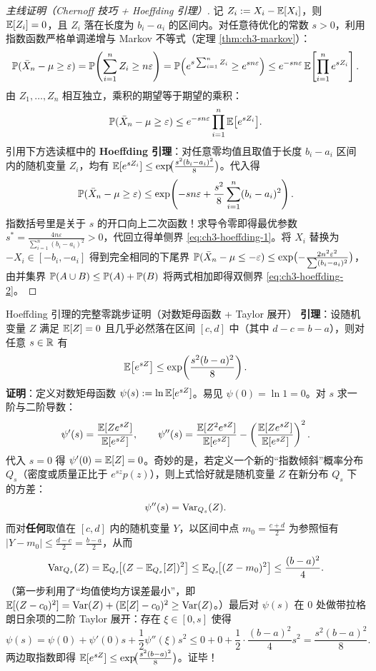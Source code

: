 \begin{proof}[主线证明（Chernoff 技巧 + Hoeffding 引理）]
记 $Z_i := X_i - \mathbb{E}[X_i]$，则 $\mathbb{E}[Z_i] = 0$，且 $Z_i$ 落在长度为 $b_i - a_i$ 的区间内。对任意待优化的常数 $s > 0$，利用指数函数严格单调递增与 Markov 不等式（定理 \ref{thm:ch3-markov}）：
\[
  \mathbb{P}(\bar{X}_n - \mu \ge \varepsilon)
  = \mathbb{P}\!\left(\sum_{i=1}^n Z_i \ge n\varepsilon\right)
  = \mathbb{P}\!\left(e^{s \sum_{i=1}^n Z_i} \ge e^{s n \varepsilon}\right)
  \le e^{-s n \varepsilon}\, \mathbb{E}\!\left[\prod_{i=1}^n e^{s Z_i}\right].
\]
由 $Z_1, \dots, Z_n$ 相互独立，乘积的期望等于期望的乘积：
\[
  \mathbb{P}(\bar{X}_n - \mu \ge \varepsilon)
  \le e^{-s n \varepsilon} \prod_{i=1}^n \mathbb{E}\bigl[e^{s Z_i}\bigr].
\]
引用下方选读框中的 \textbf{Hoeffding 引理}：对任意零均值且取值于长度 $b_i - a_i$ 区间内的随机变量 $Z_i$，均有 $\mathbb{E}[e^{s Z_i}] \le \exp\!\bigl(\frac{s^2 (b_i - a_i)^2}{8}\bigr)$。代入得
\[
  \mathbb{P}(\bar{X}_n - \mu \ge \varepsilon)
  \le \exp\!\left(-s n \varepsilon + \frac{s^2}{8}\sum_{i=1}^n (b_i - a_i)^2\right).
\]
指数括号里是关于 $s$ 的开口向上二次函数！求导令零即得最优参数 $s^* = \frac{4 n \varepsilon}{\sum_{i=1}^n (b_i - a_i)^2} > 0$，代回立得单侧界 \eqref{eq:ch3-hoeffding-1}。将 $X_i$ 替换为 $-X_i \in [-b_i, -a_i]$ 得到完全相同的下尾界 $\mathbb{P}(\bar{X}_n - \mu \le -\varepsilon) \le \exp\bigl(-\frac{2n^2\varepsilon^2}{\sum (b_i-a_i)^2}\bigr)$，由并集界 $\mathbb{P}(A \cup B) \le \mathbb{P}(A) + \mathbb{P}(B)$ 将两式相加即得双侧界 \eqref{eq:ch3-hoeffding-2}。
\end{proof}

\begin{extBox}{Hoeffding 引理的完整零跳步证明（对数矩母函数 + Taylor 展开）}
\textbf{引理}：设随机变量 $Z$ 满足 $\mathbb{E}[Z] = 0$ 且几乎必然落在区间 $[c, d]$ 中（其中 $d - c = b - a$），则对任意 $s \in \mathbb{R}$ 有
\[
  \mathbb{E}\bigl[e^{s Z}\bigr] \le \exp\!\left(\frac{s^2 (b-a)^2}{8}\right).
\]
\textbf{证明}：定义对数矩母函数 $\psi(s) := \ln \mathbb{E}[e^{s Z}]$。易见 $\psi(0) = \ln 1 = 0$。对 $s$ 求一阶与二阶导数：
\[
  \psi'(s) = \frac{\mathbb{E}[Z e^{sZ}]}{\mathbb{E}[e^{sZ}]},
  \qquad
  \psi''(s) = \frac{\mathbb{E}[Z^2 e^{sZ}]}{\mathbb{E}[e^{sZ}]} - \left(\frac{\mathbb{E}[Z e^{sZ}]}{\mathbb{E}[e^{sZ}]}\right)^2.
\]
代入 $s = 0$ 得 $\psi'(0) = \mathbb{E}[Z] = 0$。奇妙的是，若定义一个新的“指数倾斜”概率分布 $Q_s$（密度或质量正比于 $e^{sz} p(z)$），则上式恰好就是随机变量 $Z$ 在新分布 $Q_s$ 下的方差：
\[
  \psi''(s) = \operatorname{Var}_{Q_s}(Z).
\]
而对\textbf{任何}取值在 $[c, d]$ 内的随机变量 $Y$，以区间中点 $m_0 = \frac{c+d}{2}$ 为参照恒有 $|Y - m_0| \le \frac{d-c}{2} = \frac{b-a}{2}$，从而
\[
  \operatorname{Var}_{Q_s}(Z) = \mathbb{E}_{Q_s}\!\bigl[(Z - \mathbb{E}_{Q_s}[Z])^2\bigr] \le \mathbb{E}_{Q_s}\!\bigl[(Z - m_0)^2\bigr] \le \frac{(b-a)^2}{4}.
\]
（第一步利用了“均值使均方误差最小”，即 $\mathbb{E}[(Z-c_0)^2] = \operatorname{Var}(Z) + (\mathbb{E}[Z]-c_0)^2 \ge \operatorname{Var}(Z)$。）最后对 $\psi(s)$ 在 $0$ 处做带拉格朗日余项的二阶 Taylor 展开：存在 $\xi \in [0, s]$ 使得
\[
  \psi(s) = \psi(0) + \psi'(0)s + \frac{1}{2}\psi''(\xi) s^2 \le 0 + 0 + \frac{1}{2}\cdot\frac{(b-a)^2}{4} s^2 = \frac{s^2 (b-a)^2}{8}.
\]
两边取指数即得 $\mathbb{E}[e^{sZ}] \le \exp\!\bigl(\frac{s^2(b-a)^2}{8}\bigr)$。证毕！
\end{extBox}

